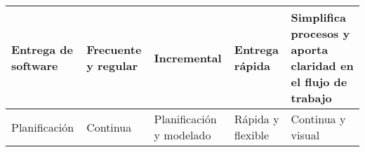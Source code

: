 \begin{longtable}{|p{2.5cm}|p{2.5cm}|p{2.5cm}|p{2.5cm}|p{2.5cm}|}
    Entrega de software                            & Frecuente y regular                                                                                    & Incremental                                                                                    & Entrega rápida                                                                             & Simplifica procesos y aporta claridad en el flujo de trabajo                            \\\hline
    Planificación                                  & Continua                                                                                               & Planificación y modelado                                                                       & Rápida y flexible                                                                          & Continua y visual                                                                       \\
\end{longtable}
